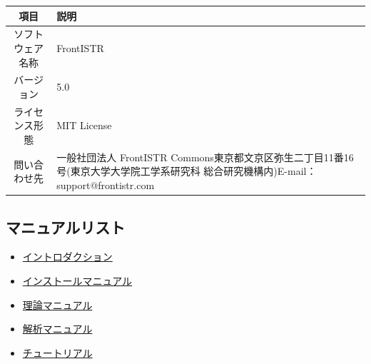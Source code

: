 \documentclass[a4paper,pandoc,ja=standard]{bxjsarticle}
\providecommand{\tightlist}{%
  \setlength{\itemsep}{0pt}\setlength{\parskip}{0pt}}
\begin{document}
\begin{longtable}[]{@{}cl@{}}
\toprule
\begin{minipage}[b]{0.55\columnwidth}\centering
項目\strut
\end{minipage} & \begin{minipage}[b]{0.39\columnwidth}\raggedright
説明\strut
\end{minipage}\tabularnewline
\midrule
\endhead
\begin{minipage}[t]{0.55\columnwidth}\centering
ソフトウェア名称\strut
\end{minipage} & \begin{minipage}[t]{0.39\columnwidth}\raggedright
FrontISTR\strut
\end{minipage}\tabularnewline
\begin{minipage}[t]{0.55\columnwidth}\centering
バージョン\strut
\end{minipage} & \begin{minipage}[t]{0.39\columnwidth}\raggedright
5.0\strut
\end{minipage}\tabularnewline
\begin{minipage}[t]{0.55\columnwidth}\centering
ライセンス形態\strut
\end{minipage} & \begin{minipage}[t]{0.39\columnwidth}\raggedright
MIT License\strut
\end{minipage}\tabularnewline
\begin{minipage}[t]{0.55\columnwidth}\centering
問い合わせ先\strut
\end{minipage} & \begin{minipage}[t]{0.39\columnwidth}\raggedright
一般社団法人 FrontISTR Commons東京都文京区弥生二丁目11番16号(東京大学大学院工学系研究科 総合研究機構内)E-mail：support@frontistr.com\strut
\end{minipage}\tabularnewline
\bottomrule
\end{longtable}

\hypertarget{ux30deux30cbux30e5ux30a2ux30ebux30eaux30b9ux30c8}{%
\subsection{マニュアルリスト}\label{ux30deux30cbux30e5ux30a2ux30ebux30eaux30b9ux30c8}}

\begin{itemize}
\tightlist
\item
  \href{../intro/index.md}{イントロダクション}
\item
  \href{../install/index.md}{インストールマニュアル}
\item
  \href{../theory/index.md}{理論マニュアル}
\item
  \href{../analysis/index.md}{解析マニュアル}
\item
  \href{../tutorial/index.md}{チュートリアル}
\end{itemize}
\end{document}
